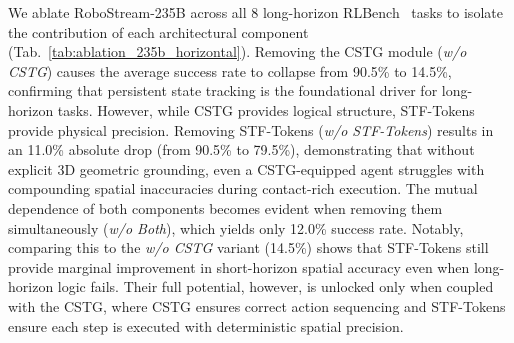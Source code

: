 We ablate RoboStream-235B across all 8 long-horizon RLBench~\cite{james2020rlbench} tasks to isolate the contribution of each architectural component (Tab.~\ref{tab:ablation_235b_horizontal}). Removing the CSTG module (\textit{w/o CSTG}) causes the average success rate to collapse from 90.5\% to 14.5\%, confirming that persistent state tracking is the foundational driver for long-horizon tasks. However, while CSTG provides logical structure, STF-Tokens provide physical precision. Removing STF-Tokens (\textit{w/o STF-Tokens}) results in an 11.0\% absolute drop (from 90.5\% to 79.5\%), demonstrating that without explicit 3D geometric grounding, even a CSTG-equipped agent struggles with compounding spatial inaccuracies during contact-rich execution. The mutual dependence of both components becomes evident when removing them simultaneously (\textit{w/o Both}), which yields only 12.0\% success rate. Notably, comparing this to the \textit{w/o CSTG} variant (14.5\%) shows that STF-Tokens still provide marginal improvement in short-horizon spatial accuracy even when long-horizon logic fails. Their full potential, however, is unlocked only when coupled with the CSTG, where CSTG ensures correct action sequencing and STF-Tokens ensure each step is executed with deterministic spatial precision.

